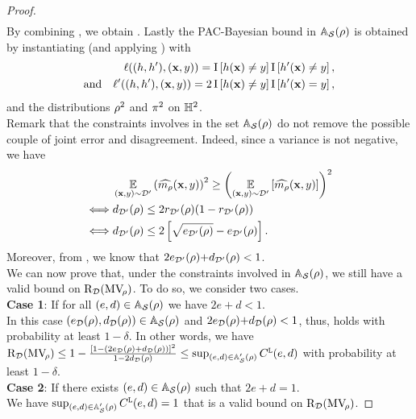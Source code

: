 \begin{noaddcontents}
\begin{proof}
\begin{align}
\end{align}
By combining , we obtain .
Lastly the PAC-Bayesian bound in $\Abb_{\dS}(\Q)$ is obtained by instantiating  (and applying ) with
\begin{align*}
\loss((\h, \h'), (\x,\y)) = \indic\LB \h(\x)\ne \y\RB\indic\LB \h'(\x)\ne \y \RB,\\
\text{and}\quad \loss'((\h, \h'), (\x,\y)) = 2\indic\LB \h(\x)\ne \y\RB\indic\LB \h'(\x)= \y\RB,
\end{align*}
and the distributions $\Q^2$ and $\P^2$ on $\H^2$.\\

Remark that the constraints involves in the set $\Abb_{\dS}(\Q)$ do not remove the possible couple of joint error and disagreement. 
Indeed, since a variance is not negative, we have
\begin{align*}
    &\EE_{(\x,\y)\sim\Dp}\LP \OmMaQ(\x,\y)\RP^2 \ge \LP\EE_{(\x,\y)\sim\Dp}\LB \OmMaQ(\x,\y)\RB\RP^2\\
    \iff &d_{\Dp}(\Q) \le 2r_{\Dp}(\Q)(1-r_{\Dp}(\Q))\\
    \iff &d_{\Dp}(\Q) \le 2\LB\sqrt{e_{\Dp}(\Q)}-e_{\Dp}(\Q)\RB.
\end{align*}
Moreover, from , we know that $2e_{\Dp}(\Q){+}d_{\Dp}(\Q)<1$.\\

We can now prove that, under the constraints involved in $\Abb_{\dS}(\Q)$, we still have a valid bound on $\Risk_{\D}(\MVQ)$.
To do so, we consider two cases.\\[1mm]
{\bf Case 1}: If for all $(e,d)\in \Abb_{\dS}(\Q)$ we have $2e{+}d<1$.\\ 
In this case $(e_{\D}(\Q), d_{\D}(\Q))\in \Abb_{\dS}(\Q)$ and $2e_{\D}(\Q){+}d_{\D}(\Q)<1$, thus, 
 holds with probability at least $1-\delta$. 
In other words, we have
$\Risk_{\D}(\MVQ)\le1-\frac{\LB 1-\LP 2e_{\D}(\Q)+d_{\D}(\Q)\RP \RB^2}{1-2d_{\D}(\Q)}
\le \sup_{(e,d)\in\Abb'_{\dS}(\Q)}\CBound^{\tt L}(e,d)$ with probability at least $1-\delta$.\\[1mm]
{\bf Case 2}: If there exists $(e,d)\in \Abb_{\dS}(\Q)$  such that $2e{+}d\!=\!1$.\\ 
We have $\sup_{(e,d)\in\Abb'_{\dS}(\Q)}\CBound^{\tt L}(e,d) = 1$ that is a valid bound on $\Risk_{\D}(\MVQ)$.
\end{proof}


\end{noaddcontents}
